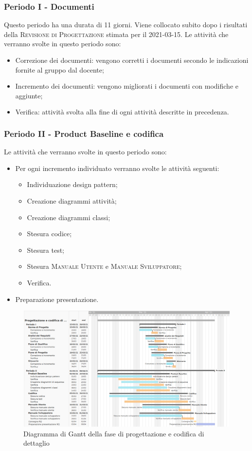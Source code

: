 \documentclass[../piano_di_progetto.tex]{subfiles}
\begin{document}
\subsubsection{Periodo I - Documenti}
Questo periodo ha una durata di 11 giorni. Viene collocato subito dopo i risultati della \textsc{Revisione di Progettazione} stimata per il 2021-03-15.
Le attività che verranno svolte in questo periodo sono:
\begin{itemize}
    \item Correzione dei documenti: vengono corretti i documenti secondo le indicazioni fornite al gruppo dal docente;
    \item Incremento dei documenti: vengono migliorati i documenti con modifiche e aggiunte;
    \item Verifica: attività svolta alla fine di ogni attività descritte in precedenza.
\end{itemize}

\subsubsection{Periodo II - Product Baseline e codifica}
Le attività che verranno svolte in questo periodo sono:
\begin{itemize}
    \item Per ogni incremento individuato verranno svolte le attività seguenti: 
    \begin{itemize}
        \item Individuazione design pattern;
        \item Creazione diagrammi attività;
        \item Creazione diagrammi classi;
        \item Stesura codice;
        \item Stesura test;
        \item Stesura \textsc{Manuale Utente} e \textsc{Manuale Sviluppatore};
        \item Verifica.
    \end{itemize}
    \item Preparazione presentazione.
\end{itemize}

\begin{figure}[H]
\centering
\includegraphics[width=18cm]{src/img/gantt/03_RQ_alternative_2.png}
\caption{Diagramma di Gantt della fase di progettazione e codifica di dettaglio}
\end{figure}
\end{document}
